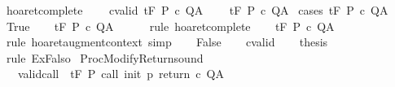 \begin{isabellebody}
\endisatagproof
{\isafoldproof}%
%
\isadelimproof
\isanewline
%
\endisadelimproof
\isanewline
{}\isamarkupfalse%
\ hoaret{\isacharunderscore}complete{\isacharprime}{\isacharcolon}\ \isanewline
\ \ \ cvalid{\isacharcolon}\ {\isachardoublequoteopen}{\isasymGamma}{\isacharcomma}{\isasymTheta}{\isasymTurnstile}\isactrlsub t\isactrlbsub {\isacharslash}F\isactrlesub \ P\ c\ Q{\isacharcomma}A{\isachardoublequoteclose}\isanewline
\ \ \ \ {\isachardoublequoteopen}{\isasymGamma}{\isacharcomma}{\isasymTheta}{\isasymturnstile}\isactrlsub t\isactrlbsub {\isacharslash}F\isactrlesub \ P\ c\ Q{\isacharcomma}A{\isachardoublequoteclose}\isanewline
%
\isadelimproof
%
\endisadelimproof
%
\isatagproof
{}\isamarkupfalse%
\ {\isacharparenleft}cases\ {\isachardoublequoteopen}{\isasymGamma}{\isasymTurnstile}\isactrlsub t\isactrlbsub {\isacharslash}F\isactrlesub \ P\ c\ Q{\isacharcomma}A{\isachardoublequoteclose}{\isacharparenright}\isanewline
\ \ \isamarkupfalse%
\ True\isanewline
\ \ \isamarkupfalse%
\ {\isachardoublequoteopen}{\isasymGamma}{\isacharcomma}{\isacharbraceleft}{\isacharbraceright}{\isasymturnstile}\isactrlsub t\isactrlbsub {\isacharslash}F\isactrlesub \ P\ c\ Q{\isacharcomma}A{\isachardoublequoteclose}\isanewline
\ \ \ \ \isamarkupfalse%
\ {\isacharparenleft}rule\ hoaret{\isacharunderscore}complete{\isacharparenright}\isanewline
\ \ \isamarkupfalse%
\ {\isachardoublequoteopen}{\isasymGamma}{\isacharcomma}{\isasymTheta}{\isasymturnstile}\isactrlsub t\isactrlbsub {\isacharslash}F\isactrlesub \ P\ c\ Q{\isacharcomma}A{\isachardoublequoteclose}\isanewline
\ \ \ \ \isamarkupfalse%
\ {\isacharparenleft}rule\ hoaret{\isacharunderscore}augment{\isacharunderscore}context{\isacharparenright}\ simp\isanewline
{}\isamarkupfalse%
\isanewline
\ \ \isamarkupfalse%
\ False\isanewline
\ \ \isamarkupfalse%
\ cvalid\isanewline
\ \ \isamarkupfalse%
\ {\isacharquery}thesis\isanewline
\ \ \ \ \isamarkupfalse%
\ {\isacharparenleft}rule\ ExFalso{\isacharparenright}\isanewline
{}\isamarkupfalse%
%
\endisatagproof
{\isafoldproof}%
%
\isadelimproof
%
\endisadelimproof
%
\isamarkuptrue%
%
\isamarkuptrue%
\isamarkupfalse%
\ ProcModifyReturn{\isacharunderscore}sound{\isacharcolon}\isanewline
\ \ \ valid{\isacharunderscore}call{\isacharcolon}\ {\isachardoublequoteopen}{\isasymGamma}{\isacharcomma}{\isasymTheta}\ {\isasymTurnstile}\isactrlsub t\isactrlbsub {\isacharslash}F\isactrlesub \ P\ call\ init\ p\ return{\isacharprime}\ c\ Q{\isacharcomma}A{\isachardoublequoteclose}\isanewline

\end{isabellebody}
